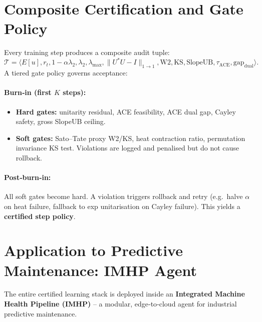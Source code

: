 \documentclass[12pt]{article}
\theoremstyle{plain}
\theoremstyle{definition}
\theoremstyle{remark}
\begin{document}
\section{Composite Certification and Gate Policy}
\label{sec:gates}

Every training step produces a composite audit tuple:
\[
\mathcal{T} = \langle E[u], r_t, 1-\alpha\lambda_2, \lambda_2, \lambda_{\max}, \|U^*U-I\|_{1\to1}, \text{W2}, \text{KS}, \text{SlopeUB}, \tau_{\text{ACE}}, \text{gap}_{\text{dual}} \rangle.
\]
A tiered gate policy governs acceptance:

\paragraph{Burn‑in (first $K$ steps):}
\begin{itemize}[nosep]
    \item \textbf{Hard gates:} unitarity residual, ACE feasibility, ACE dual gap, Cayley safety, gross SlopeUB ceiling.
    \item \textbf{Soft gates:} Sato–Tate proxy W2/KS, heat contraction ratio, permutation invariance KS test. Violations are logged and penalised but do not cause rollback.
\end{itemize}

\paragraph{Post‑burn‑in:}
All soft gates become hard. A violation triggers rollback and retry (e.g.\ halve $\alpha$ on heat failure, fallback to exp unitarisation on Cayley failure). This yields a \textbf{certified step policy}.

\section{Application to Predictive Maintenance: IMHP Agent}
\label{sec:imhp}

The entire certified learning stack is deployed inside an \textbf{Integrated Machine Health Pipeline (IMHP)} -- a modular, edge‑to‑cloud agent for industrial predictive maintenance.
\end{document}
